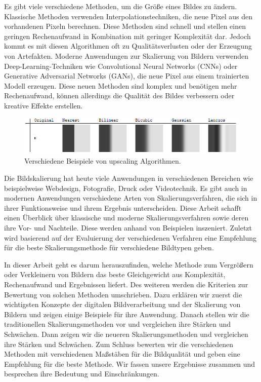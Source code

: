 Es gibt viele verschiedene Methoden, um die Größe eines Bildes zu ändern.
Klassische Methoden verwenden Interpolationstechniken, die neue Pixel aus den vorhandenen Pixeln berechnen.
Diese Methoden sind schnell und stellen einen geringen Rechenaufwand in Kombination mit geringer Komplexität dar.
Jedoch kommt es mit diesen Algorithmen oft zu Qualitätsverlusten oder der Erzeugung von Artefakten.
Moderne Anwendungen zur Skalierung von Bildern verwenden Deep-Learning-Techniken wie Convolutional Neural Networks (CNNs) oder Generative Adversarial Networks (GANs), die neue Pixel aus einem trainierten Modell erzeugen.
Diese neuen Methoden sind komplex und benötigen mehr Rechenaufwand, können allerdings die Qualität des Bildes verbessern oder kreative Effekte erstellen.

\begin{figure}[h!]
    \vspace{8mm}
    \centering
    \includegraphics{img/xaR8r.png}
    \caption{Verschiedene Beispiele von upscaling Algorithmen\cite{whuber.lanczos}.}
    \label{fig:my_label}
    \vspace{4mm}
\end{figure}

Die Bildskalierung hat heute viele Anwendungen in verschiedenen Bereichen wie beispielweise Webdesign, Fotografie, Druck oder Videotechnik.
Es gibt auch in modernen Anwendungen verschiedene Arten von Skalierungsverfahren, die sich in ihrer Funktionsweise und ihrem Ergebnis unterscheiden.
Diese Arbeit schafft einen Überblick über klassische und moderne Skalierungsverfahren sowie deren ihre Vor- und Nachteile.
Diese werden anhand von Beispielen inszeniert.
Zuletzt wird basierend auf der Evaluierung der verschiedenen Verfahren eine Empfehlung für die beste Skalierungsmethode für verschiedene Bildtypen geben.

In dieser Arbeit geht es darum herauszufinden, welche Methode zum Vergrößern oder Verkleinern von Bildern das beste Gleichgewicht aus Komplexität, Rechenaufwand und Ergebnissen liefert.
Des weiteren werden die Kriterien zur Bewertung von solchen Methoden umschrieben.
Dazu erklären wir zuerst die wichtigsten Konzepte der digitalen Bildverarbeitung und der Skalierung von Bildern und zeigen einige Beispiele für ihre Anwendung. Danach stellen wir die traditionellen Skalierungsmethoden vor und vergleichen ihre Stärken und Schwächen. Dann zeigen wir die neueren Skalierungsmethoden und vergleichen ihre Stärken und Schwächen. Zum Schluss bewerten wir die verschiedenen Methoden mit verschiedenen Maßstäben für die Bildqualität und geben eine Empfehlung für die beste Methode. Wir fassen unsere Ergebnisse zusammen und besprechen ihre Bedeutung und Einschränkungen.
